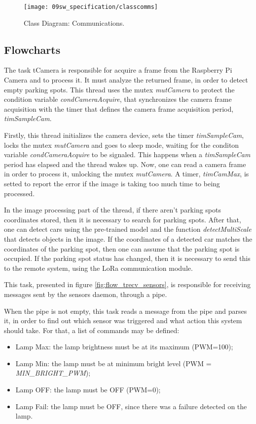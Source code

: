 \begin{figure}[H]
	\centering		\texttt{[image: 09sw\_specification/classcomms]}
	\caption{Class Diagram: Communications.}
	\label{fig:classcomm}
\end{figure}

\subsection{Flowcharts}
{}

The task tCamera is responsible for acquire a frame from the Raspberry Pi Camera and to process it. It must analyze the returned frame, in order to detect empty parking spots. This thread uses the mutex \textit{mutCamera} to protect the condition variable \textit{condCameraAcquire}, that synchronizes the camera frame acquisition with the timer that defines the camera frame acquisition period, \textit{timSampleCam}.

Firstly, this thread initializes the camera device, sets the timer \textit{timSampleCam}, locks the mutex \textit{mutCamera} and goes to sleep mode, waiting for the conditon variable \textit{condCameraAcquire} to be signaled. This happens when a \textit{timSampleCam} period has elapsed and the thread wakes up. Now, one can read a camera frame in order to process it, unlocking the mutex \textit{mutCamera}. A timer, \textit{timCamMax}, is setted to report the error if the image is taking too much time to being processed.

In the image processing part of the thread, if there aren't parking spots coordinates stored, then it is necessary to search for parking spots. After that, one can detect cars using the pre-trained model and the function \textit{detectMultiScale} that detects objects in the image. If the coordinates of a detected car matches the coordinates of the parking spot, then one can assume that the parking spot is occupied. If the parking spot status has changed, then it is necessary to send this to the remote system, using the LoRa communication module.


This task, presented in figure \ref{fig:flow_trecv_sensors}, is responsible for receiving messages sent by the sensors daemon, through a pipe.

When the pipe is not empty, this task reads a message from the pipe and parses it, in order to find out which sensor was triggered and what action this system should take. For that, a list of commands may be defined:
\begin{itemize}
	\item Lamp Max: the lamp brightness must be at its maximum (PWM=100);
	\item Lamp Min: the lamp must be at minimum bright level (PWM = \textit{MIN\_BRIGHT\_PWM});
	\item Lamp OFF: the lamp must be OFF (PWM=0);
	\item Lamp Fail: the lamp must be OFF, since there was a failure detected on the lamp.
\end{itemize}

